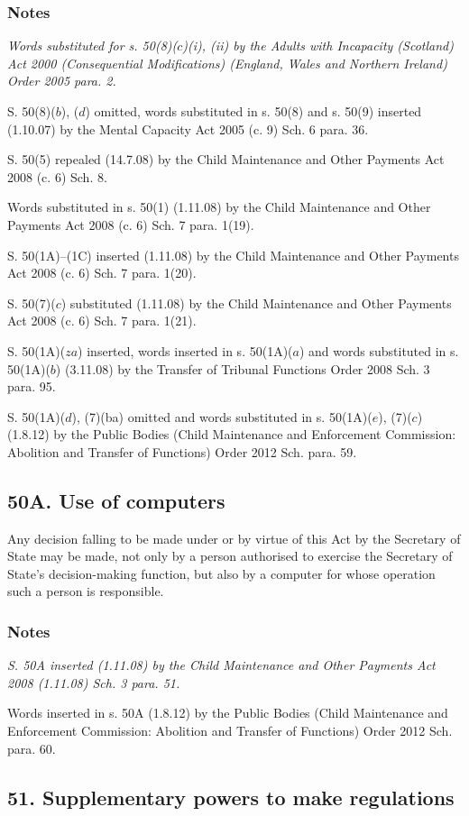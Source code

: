 \documentclass[a4paper]{article}
\newcommand\amendment[1]{\subsubsection*{Notes}{\itshape\frenchspacing\footnotesize #1 \par}}
\begin{document}
\amendment{
Words substituted for s. 50(8)($c$)(i), (ii) by the Adults with Incapacity (Scotland) Act 2000 (Consequential Modifications) (England, Wales and Northern Ireland) Order 2005 para. 2.

S. 50(8)($b$), ($d$) omitted, words substituted in s. 50(8) and s. 50(9) inserted (1.10.07) by the Mental Capacity Act 2005 (c. 9) Sch. 6 para. 36.

S. 50(5) repealed (14.7.08) by the Child Maintenance and Other Payments Act 2008 (c. 6) Sch. 8.

Words substituted in s. 50(1) (1.11.08) by the Child Maintenance and Other Payments Act 2008 (c. 6) Sch. 7 para. 1(19).

S. 50(1A)--(1C) inserted (1.11.08) by the Child Maintenance and Other Payments Act 2008 (c. 6) Sch. 7 para. 1(20).

S. 50(7)($c$) substituted  (1.11.08) by the Child Maintenance and Other Payments Act 2008 (c. 6) Sch. 7 para. 1(21).

S. 50(1A)($za$) inserted, words inserted in s. 50(1A)($a$) and words substituted in s. 50(1A)($b$) (3.11.08) by the Transfer of Tribunal Functions Order 2008 Sch. 3 para. 95.

S. 50(1A)($d$), (7)(ba) omitted and words substituted in s. 50(1A)($e$), (7)($c$) (1.8.12) by the Public Bodies (Child Maintenance and Enforcement Commission: Abolition and Transfer of Functions) Order 2012 Sch. para. 59.
}

\subsection{50A. Use of computers}

Any decision falling to be made under or by virtue of this Act by the Secretary of State may be made, not only by a person authorised to exercise the Secretary of State’s decision-making function, but also by a computer for whose
operation such a person is responsible.

\amendment{
S. 50A inserted (1.11.08) by the Child Maintenance and Other Payments Act 2008 (1.11.08) Sch. 3 para. 51.

Words inserted in s. 50A (1.8.12) by the Public Bodies (Child Maintenance and Enforcement Commission: Abolition and Transfer of Functions) Order 2012 Sch. para. 60.
}

\subsection{51. Supplementary powers to make regulations}
\end{document}
